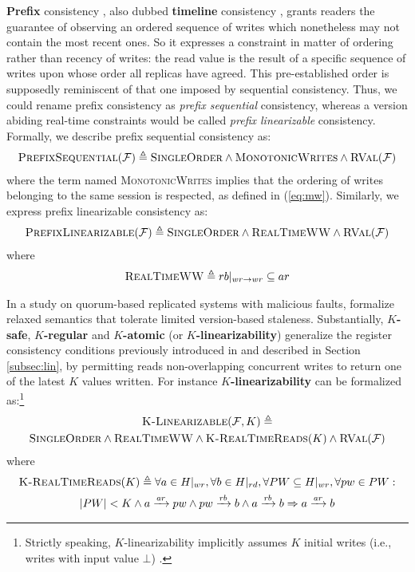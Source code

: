 \documentclass[letter, 11pt]{article}
\newcommand{\RVAL}{\textsc{RVal}(\mathcal{F})}
\newcommand{\citeN}{\citet}
\renewcommand{\cite}{\citep}
\begin{document}
\textbf{Prefix} consistency \cite{Terry.ea:95,Terry:13}, 
also dubbed \textbf{timeline} consistency \cite{Cooper.Ramakrishnan.ea:08}, 
grants readers the guarantee of observing an ordered sequence of writes which nonetheless 
may not contain the most recent ones.
So it expresses a constraint in matter of ordering rather than recency of writes: 
the read value is the result of a specific sequence of writes upon whose order all replicas have agreed.
This pre-established order is supposedly reminiscent of that one imposed by sequential consistency. 
Thus, we could rename prefix consistency as \emph{prefix sequential} consistency,
whereas a version abiding real-time constraints would be called \emph{prefix linearizable} consistency. 
Formally, we describe prefix sequential consistency as:
\begin{align}
\textsc{PrefixSequential}(\mathcal{F}) \triangleq \textsc{SingleOrder} \wedge \textsc{MonotonicWrites} \wedge \RVAL
\end{align}
where the term named \textsc{MonotonicWrites} implies that the ordering of writes belonging to the same session is respected, as defined in (\ref{eq:mw}).
Similarly, we express prefix linearizable consistency as:
\begin{align}
\textsc{PrefixLinearizable}(\mathcal{F}) \triangleq \textsc{SingleOrder} \wedge \textsc{RealTimeWW} \wedge \RVAL
\end{align}
where
\begin{align}
\textsc{RealTimeWW} \triangleq rb|_{wr \rightarrow wr} \subseteq ar
\end{align}





In a study on quorum-based replicated systems with malicious faults, \citeN{Aiyer.ea:05} formalize relaxed semantics 
that tolerate limited version-based staleness.
Substantially, \textbf{$K$-safe}, \textbf{$K$-regular} and \textbf{$K$-atomic} (or \textbf{$K$-linearizability}) generalize 
the register consistency conditions previously introduced in \cite{Lamport:86:vol1}
and described in Section \ref{subsec:lin}, by permitting reads non-overlapping concurrent writes to return one of the latest $K$ values written. For instance \textbf{$K$-linearizability} can be formalized as:\footnote{Strictly speaking, $K$-linearizability implicitly assumes $K$ initial writes (i.e., writes with input value $\bot$) \cite{Aiyer.ea:05}.} 
\begin{multline}
\textsc{K-Linearizable}(\mathcal{F}, K) \triangleq \\ 
\textsc{SingleOrder} \wedge \textsc{RealTimeWW} \wedge \textsc{K-RealTimeReads}(K) \wedge \RVAL
\end{multline}
where
\begin{multline}
\label{eq:RTKreads}
\textsc{K-RealTimeReads}(K) \triangleq 
\forall a \in H|_{wr}, \forall b\in H|_{rd}, \forall PW \subseteq H|_{wr}, \forall pw\in PW: \\ 
|PW|<K \wedge a\xrightarrow[]{\text{\textit{ar}}}pw \wedge
pw\xrightarrow[]{\text{\textit{rb}}}b \wedge a\xrightarrow[]{\text{\textit{rb}}}b
\Rightarrow a\xrightarrow[]{\text{\textit{ar}}}b
\end{multline}
\end{document}
